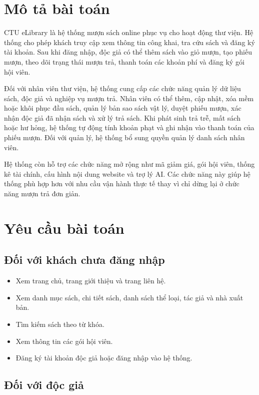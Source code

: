 \documentclass[../main.tex]{subfiles}
\begin{document}
\section{Mô tả bài toán}

CTU eLibrary là hệ thống mượn sách online phục vụ cho hoạt động thư viện. Hệ thống cho phép khách truy cập xem thông tin công khai, tra cứu sách và đăng ký tài khoản. Sau khi đăng nhập, độc giả có thể thêm sách vào giỏ mượn, tạo phiếu mượn, theo dõi trạng thái mượn trả, thanh toán các khoản phí và đăng ký gói hội viên.

Đối với nhân viên thư viện, hệ thống cung cấp các chức năng quản lý dữ liệu sách, độc giả và nghiệp vụ mượn trả. Nhân viên có thể thêm, cập nhật, xóa mềm hoặc khôi phục đầu sách, quản lý bản sao sách vật lý, duyệt phiếu mượn, xác nhận độc giả đã nhận sách và xử lý trả sách. Khi phát sinh trả trễ, mất sách hoặc hư hỏng, hệ thống tự động tính khoản phạt và ghi nhận vào thanh toán của phiếu mượn. Đối với quản lý, hệ thống bổ sung quyền quản lý danh sách nhân viên.

Hệ thống còn hỗ trợ các chức năng mở rộng như mã giảm giá, gói hội viên, thống kê tài chính, cấu hình nội dung website và trợ lý AI. Các chức năng này giúp hệ thống phù hợp hơn với nhu cầu vận hành thực tế thay vì chỉ dừng lại ở chức năng mượn trả đơn giản.

\section{Yêu cầu bài toán}

\subsection{Đối với khách chưa đăng nhập}

\begin{itemize}
    \item Xem trang chủ, trang giới thiệu và trang liên hệ.
    \item Xem danh mục sách, chi tiết sách, danh sách thể loại, tác giả và nhà xuất bản.
    \item Tìm kiếm sách theo từ khóa.
    \item Xem thông tin các gói hội viên.
    \item Đăng ký tài khoản độc giả hoặc đăng nhập vào hệ thống.
\end{itemize}

\subsection{Đối với độc giả}
\end{document}
